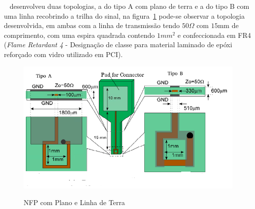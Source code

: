 ~ desenvolveu duas topologias, a do tipo A com plano de terra e a do tipo B com uma linha recobrindo a trilha do sinal, na figura~\ref{fig:funato2006} pode-se observar a topologia desenvolvida, em ambas com a linha de transmissão tendo $50\Omega$ com $15$mm de comprimento, com uma espira quadrada contendo $1mm^2$ e confeccionada em FR4 (\textit{Flame Retardant 4} - Designação de classe para material laminado de epóxi reforçado com vidro utilizado em PCI).
\begin{figure}[htb!]
	\centering 
	\caption{NFP com Plano e Linha de Terra}
	\includegraphics[scale=0.6]{./img/funato2006}
	\label{fig:funato2006}
\end{figure}

